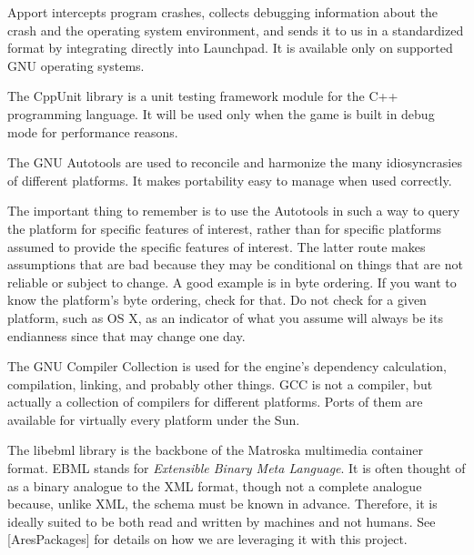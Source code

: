 

\startitemize[4]

Apport intercepts program crashes, collects debugging information about the crash and the operating system environment, and sends it to us in a standardized format by integrating directly into Launchpad. It is available only on supported GNU operating systems.


The CppUnit library is a unit testing framework module for the C++ programming language. It will be used only when the game is built in debug mode for performance reasons.


The GNU Autotools are used to reconcile and harmonize the many idiosyncrasies of different platforms. It makes  portability easy to manage when used correctly. 

The important thing to remember is to use the Autotools in such a way to query the platform for specific features of interest, rather than for specific platforms assumed to provide the specific features of interest. The latter route makes assumptions that are bad because they may be conditional on things that are not reliable or subject to change. A good example is in byte ordering. If you want to know the platform's byte ordering, check for that. Do not check for a given platform, such as OS X, as an indicator of what you assume will always be its endianness since that may change one day.


The GNU Compiler Collection is used for the engine's dependency calculation, compilation, linking, and probably other things. GCC is not a compiler, but actually a collection of compilers for different platforms. Ports of them are available for virtually every platform under the Sun.


The libebml library is the backbone of the Matroska multimedia container format. EBML stands for {\it Extensible Binary Meta Language}. It is often thought of as a binary analogue to the XML format, though not a complete analogue because, unlike XML, the schema must be known in advance. Therefore, it is ideally suited to be both read and written by machines and not humans. See [AresPackages] for details on how we are leveraging it with this project.

